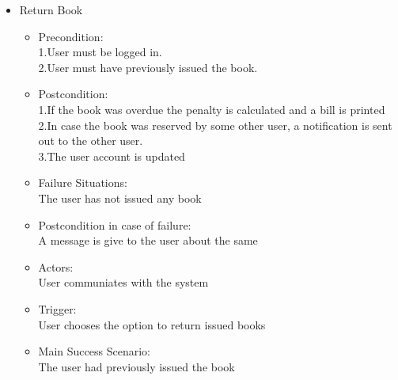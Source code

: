 \documentclass[a4paper]{article}
\begin{document}
\begin{enumerate}
\begin{itemize}
 \item Return Book\\
 \begin{itemize}
 \item Precondition:\\
 1.User must be logged in.\\
 2.User must have previously issued the book.\\
 \item Postcondition:\\
 1.If the book was overdue the penalty is calculated and a bill is printed\\ 
 2.In case the book was reserved by some other user, a notification is sent out to the other user.\\
 3.The user account is updated\\
 \item Failure Situations:\\The user has not issued any book\\
 \item Postcondition in case of failure:\\A message is give to the user about the same\\
 \item Actors:\\ User communiates with the system\\
 \item Trigger:\\ User chooses the option to return issued books\\
\item  Main Success Scenario: \\The user had previously issued the book\\
 \end{itemize}
 

\end{itemize}
\end{enumerate}
\end{document}
